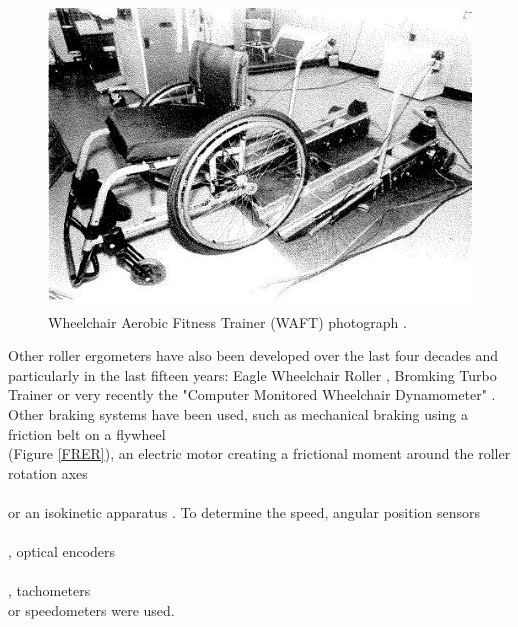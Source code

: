 \begin{figure}[h]
\center
\includegraphics[scale = 25]{images/WAFT}
\caption{ Wheelchair Aerobic Fitness Trainer (WAFT) photograph \cite{langbein1993research}.}
\label{WAFT}
\end{figure}


Other roller ergometers have also been developed over the last four decades and particularly in the last fifteen years: Eagle Wheelchair Roller \cite{kerk1995effect}, Bromking Turbo Trainer \cite{goosey2001kinetic} \cite{goosey2001kinetic} \cite{ price1999thermoregulatory} or very recently the "Computer Monitored Wheelchair Dynamometer" \cite{cooper2003wheelchair}  \cite{digiovine2001dynamic}.  Other braking systems have been used, such as mechanical braking using a friction belt on a flywheel\\\cite{goosey1998relationship}  \cite{kulig2001effect} \cite{rodgers1994biomechanics}(Figure \ref{FRER}), an electric motor creating a frictional moment around the roller rotation axes \\\cite{coutts1987aerobic} \cite{kerk1995effect} \cite{patterson1997selected}     \\ \cite{vanlandewijck1999field} or an isokinetic apparatus  \cite{ruggles1994biomechanics}. To determine the speed, angular position sensors  \cite{brouha1967continuous}  \\ \cite{coutts1987aerobic}  \cite{coutts1990kinematics}  \cite{patterson1997selected} \\ \cite{rodgers1994biomechanics}, optical encoders   \cite{devillard1999wheelchair} \cite{devillard2001validation}   \\ \cite{langbein1993calibration}  \cite{langbein1994initial}  \cite{newsam1996temporal}  \\ \cite{theisen1996new}, tachometers  \cite{cooper1990exploratory}  \cite{kerk1995effect}   \cite{masse1992biomechanical} \\  \cite{vanlandewijck1999field} or speedometers   \cite{goosey1998relationship}  \cite{rodgers1994biomechanics} were used.

